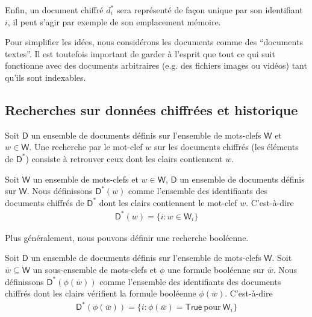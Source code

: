 Enfin, un document chiffré $d_i^*$ sera représenté de façon unique par son
identifiant $i$, il peut s'agir par exemple de son emplacement mémoire.

\begin{remark}
Pour simplifier les idées, nous considérons les documents comme des
``documents textes''. Il est toutefois important de garder à l'esprit que tout
ce qui suit fonctionne avec des documents arbitraires (e.g. des fichiers images
ou vidéos) tant qu'ils sont indexables.
\end{remark}

\subsection{Recherches sur données chiffrées et historique}
Soit $\mathsf{D}$ un ensemble de documents définis sur l'ensemble de mots-clefs
$\mathsf{W}$ et $w \in \mathsf{W}$. Une recherche par le mot-clef $w$ sur les
documents chiffrés (les éléments de $\mathsf{D}^*$) consiste à retrouver ceux
dont les clairs contiennent $w$.

\begin{defi}
Soit $\mathsf{W}$ un ensemble de mots-clefs et $w \in \mathsf{W}$, $\mathsf{D}$
un ensemble de documents définis sur $\mathsf{W}$. Nous définissons
$\mathsf{D}^*(w)$ comme l'ensemble des identifiants des documents chiffrés de
$\mathsf{D}^*$ dont les clairs contiennent le mot-clef $w$. C'est-à-dire
\begin{align*}
\mathsf{D}^*(w)=\{i:w \in \mathsf{W}_i\}
\end{align*}
\end{defi}

Plus généralement, nous pouvons définir une recherche booléenne.

\begin{defi}
Soit $\mathsf{D}$ un ensemble de documents définis sur l'ensemble de mots-clefs
$\mathsf{W}$. Soit $\bar{w} \subseteq \mathsf{W}$ un sous-ensemble de mots-clefs
et $\phi$ une formule booléenne sur $\bar{w}$. Nous définissons $\mathsf{D}^*
(\phi(\bar{w}))$ comme l'ensemble des identifiants des documents chiffrés dont
les clairs vérifient la formule booléenne $\phi(\bar{w})$. C'est-à-dire
\begin{align*}
\mathsf{D}^*(\phi(\bar{w}))=\{i:\phi(\bar{w})=\mathsf{True}\mathrm{\ pour\ }
\mathsf{W}_i\}
\end{align*}
\end{defi}

